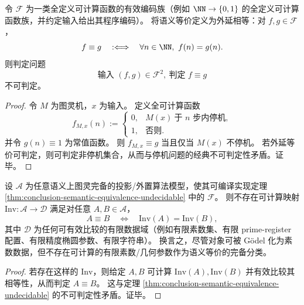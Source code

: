\begin{theorem}\label{thm:conclusion-semantic-equivalence-undecidable}
令 \(\mathcal F\) 为一类全定义可计算函数的有效编码族（例如 \(\NN\to\{0,1\}\) 的全定义可计算函数族，并约定输入给出其程序编码）。
将语义等价定义为外延相等：对 \(f,g\in\mathcal F\)，
\[
f\equiv g\quad:\Longleftrightarrow\quad \forall n\in\NN,\ f(n)=g(n).
\]
则判定问题
\[
\text{输入 }(f,g)\in\mathcal F^2,\ \text{判定 }f\equiv g
\]
不可判定。
\end{theorem}

\begin{proof}
令 \(M\) 为图灵机，\(x\) 为输入。
定义全可计算函数
\[
f_{M,x}(n):=
\begin{cases}
0,& M(x)\ \text{于 }n\text{ 步内停机},\\
1,& \text{否则}.
\end{cases}
\]
并令 \(g(n)\equiv 1\) 为常值函数。
则 \(f_{M,x}\equiv g\) 当且仅当 \(M(x)\) 不停机。
若外延等价可判定，则可判定非停机集合，从而与停机问题的经典不可判定性矛盾。证毕。
\end{proof}

\begin{corollary}[不存在可计算的有限素数完备不变量]\label{cor:conclusion-no-computable-finite-prime-complete-invariant}
设 \(\mathcal A\) 为任意语义上图灵完备的投影/外置算法模型，使其可编译实现定理 \ref{thm:conclusion-semantic-equivalence-undecidable} 中的 \(\mathcal F\)。
则不存在可计算映射 \(\mathrm{Inv}:\mathcal A\to\mathcal D\) 满足对任意 \(A,B\in\mathcal A\)，
\[
A\equiv B\quad\Longleftrightarrow\quad \mathrm{Inv}(A)=\mathrm{Inv}(B),
\]
其中 \(\mathcal D\) 为任何可有效比较的有限数据域（例如有限素数集、有限 prime-register 配置、有限精度椭圆参数、有限字符串）。
换言之，尽管对象可被 Gödel 化为素数数据，但不存在可计算的有限素数/几何参数作为语义等价的完备分类。
\end{corollary}

\begin{proof}
若存在这样的 \(\mathrm{Inv}\)，则给定 \(A,B\) 可计算 \(\mathrm{Inv}(A),\mathrm{Inv}(B)\) 并有效比较其相等性，从而判定 \(A\equiv B\)。
这与定理 \ref{thm:conclusion-semantic-equivalence-undecidable} 的不可判定性矛盾。证毕。
\end{proof}

\endinput
